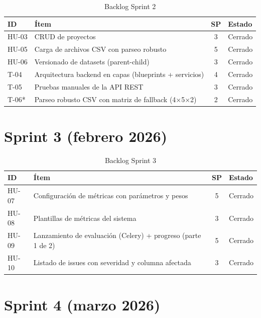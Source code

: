 \begin{table}[H]
  \centering
  \small
  \caption{Backlog Sprint 2}
  \begin{tabularx}{\textwidth}{l X c l}
    \toprule
    \textbf{ID} & \textbf{Ítem} & \textbf{SP} & \textbf{Estado} \\
    \midrule
    HU-03 & \ac{CRUD} de proyectos & 3 & Cerrado \\
    HU-05 & Carga de archivos \ac{CSV} con parseo robusto & 5 & Cerrado \\
    HU-06 & Versionado de datasets (parent-child) & 3 & Cerrado \\
    T-04  & Arquitectura backend en capas (blueprints + servicios) & 4 & Cerrado \\
    T-05  & Pruebas manuales de la API \ac{REST} & 3 & Cerrado \\
    T-06* & Parseo robusto \ac{CSV} con matriz de fallback (4×5×2) & 2 & Cerrado \\
    \bottomrule
  \end{tabularx}
\end{table}

\section*{Sprint 3 (febrero 2026)}

\begin{table}[H]
  \centering
  \small
  \caption{Backlog Sprint 3}
  \begin{tabularx}{\textwidth}{l X c l}
    \toprule
    \textbf{ID} & \textbf{Ítem} & \textbf{SP} & \textbf{Estado} \\
    \midrule
    HU-07 & Configuración de métricas con parámetros y pesos & 5 & Cerrado \\
    HU-08 & Plantillas de métricas del sistema & 3 & Cerrado \\
    HU-09 & Lanzamiento de evaluación (Celery) + progreso (parte 1 de 2) & 5 & Cerrado \\
    HU-10 & Listado de issues con severidad y columna afectada & 3 & Cerrado \\
    \bottomrule
  \end{tabularx}
\end{table}

\section*{Sprint 4 (marzo 2026)}

